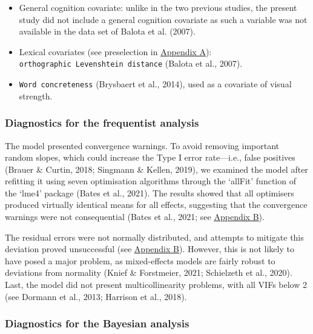 \documentclass[
  12pt,
  man,floatsintext]{apa7}
\begin{document}
\begin{itemize}
\item
  General cognition covariate: unlike in the two previous studies, the present study did not include a general cognition covariate as such a variable was not available in the data set of Balota et al. (2007).
\item
  Lexical covariates (see preselection in \protect\hyperlink{appendix-A-lexical-covariates}{\underline{Appendix A}}): \texttt{orthographic\ Levenshtein\ distance} (Balota et al., 2007).
\item
  \texttt{Word\ concreteness} (Brysbaert et al., 2014), used as a covariate of visual strength.
\end{itemize}

\hypertarget{diagnostics-for-the-frequentist-analysis-3}{%
\subsubsection{Diagnostics for the frequentist analysis}\label{diagnostics-for-the-frequentist-analysis-3}}

The model presented convergence warnings. To avoid removing important random slopes, which could increase the Type I error rate---i.e., false positives (Brauer \& Curtin, 2018; Singmann \& Kellen, 2019), we examined the model after refitting it using seven optimisation algorithms through the `allFit' function of the `lme4' package (Bates et al., 2021). The results showed that all optimisers produced virtually identical means for all effects, suggesting that the convergence warnings were not consequential (Bates et al., 2021; see \protect\hyperlink{appendix-B-frequentist-analysis-diagnostics}{\underline{Appendix B}}).

The residual errors were not normally distributed, and attempts to mitigate this deviation proved unsuccessful (see \protect\hyperlink{appendix-B-frequentist-analysis-diagnostics}{\underline{Appendix B}}). However, this is not likely to have posed a major problem, as mixed-effects models are fairly robust to deviations from normality (Knief \& Forstmeier, 2021; Schielzeth et al., 2020). Last, the model did not present multicollinearity problems, with all VIFs below 2 (see Dormann et al., 2013; Harrison et al., 2018).

\hypertarget{diagnostics-for-the-bayesian-analysis-2}{%
\subsubsection{Diagnostics for the Bayesian analysis}\label{diagnostics-for-the-bayesian-analysis-2}}
\end{document}
